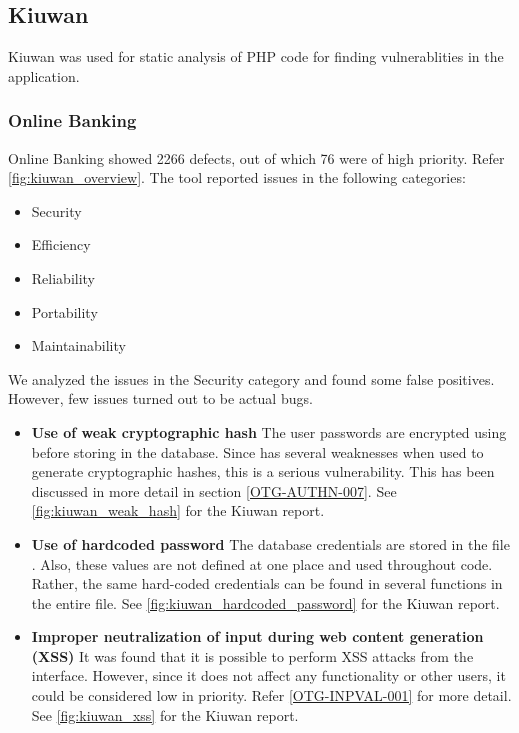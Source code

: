 \subsection{Kiuwan}
Kiuwan was used for static analysis of PHP code for finding vulnerablities in the application.
\subsubsection{Online Banking}
Online Banking showed 2266 defects, out of which 76 were of high priority. Refer \ref{fig:kiuwan_overview}. The tool reported issues in the following categories:
\begin{itemize}
    \item Security
    \item Efficiency
    \item Reliability
    \item Portability
    \item Maintainability
\end{itemize}
We analyzed the issues in the Security category and found some false positives. However, few issues turned out to be actual bugs.
\begin{itemize}
	\item \textbf{Use of weak cryptographic hash} The user passwords are encrypted using  before storing in the database. Since  has several weaknesses when used to generate cryptographic hashes, this is a serious vulnerability. This has been discussed in more detail in section \ref{OTG-AUTHN-007}. See \ref{fig:kiuwan_weak_hash} for the Kiuwan report.
	\item \textbf{Use of hardcoded password} The database credentials are stored in the file . Also, these values are not defined at one place and used throughout code. Rather, the same hard-coded credentials can be found in several functions in the entire file. See \ref{fig:kiuwan_hardcoded_password} for the Kiuwan report.
	\item \textbf{Improper neutralization of input during web content generation (XSS)} It was found that it is possible to perform XSS attacks from the  interface. However, since it does not affect any functionality or other users, it could be considered low in priority. Refer \ref{OTG-INPVAL-001} for more detail. See \ref{fig:kiuwan_xss} for the Kiuwan report.
\end{itemize}

